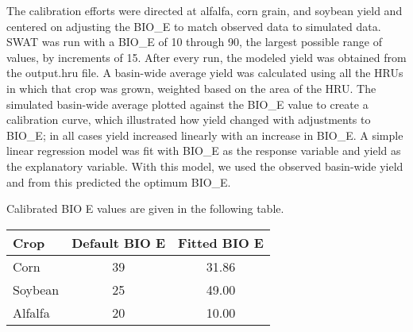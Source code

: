 The calibration efforts were directed at alfalfa, corn grain, and soybean yield and centered on adjusting the BIO\_E to match observed data to simulated data. 
SWAT was run with a BIO\_E of 10 through 90, the largest possible range of values, by increments of 15. After every run, the modeled yield was obtained from the output.hru file. A basin-wide average yield was calculated using all the HRUs in which that crop was grown, weighted based on the area of the HRU. The simulated basin-wide average plotted against the BIO\_E value to create a calibration curve, which illustrated how yield changed with adjustments to BIO\_E; in all cases yield increased linearly with an increase in BIO\_E. A simple linear regression model was fit with BIO\_E as the response variable and yield as the explanatory variable. With this model, we used the observed basin-wide yield and from this predicted the optimum BIO\_E.  

Calibrated BIO E values are given in the following table. 

\begin{table}[h!] \centering
	\begin{tabular}{l c c}
		\hline
		Crop & Default BIO E & Fitted BIO E \\[0.25ex]
		\hline \hline
		Corn & 39 & 31.86 \\
		Soybean & 25 & 49.00 \\
		Alfalfa & 20 & 10.00 \\
		\hline

	\end{tabular}
\end{table}	
\pagebreak